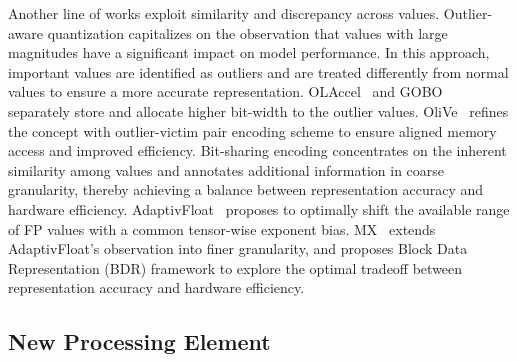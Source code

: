 Another line of works exploit similarity and discrepancy across values.
Outlier-aware quantization capitalizes on the observation that values with large magnitudes have a significant impact on model performance. In this approach, important values are identified as outliers and are treated differently from normal values to ensure a more accurate representation. 
OLAccel~\citep{park2018energy} and GOBO~\citep{zadeh2020gobo} separately store and allocate higher bit-width to the outlier values.
OliVe~\citep{guo2023olive} refines the concept with outlier-victim pair encoding scheme to ensure aligned memory access and improved efficiency.
Bit-sharing encoding concentrates on the inherent similarity among values and annotates additional information in coarse granularity, thereby achieving a balance between representation accuracy and hardware efficiency. 
AdaptivFloat~\citep{tambe2020algorithm} proposes to optimally shift the available range of FP values with a common tensor-wise exponent bias.
MX~\citep{darvish2023shared} extends AdaptivFloat's observation into finer granularity, and proposes Block Data Representation (BDR) framework to explore the optimal tradeoff between representation accuracy and hardware efficiency.

\begin{table}[htbp!]
\centering
{}
\caption{Summary of improvements in data formats. The benefits comes with negligible negative impacts on other factors.}
\end{table}

\subsection{New Processing Element}

